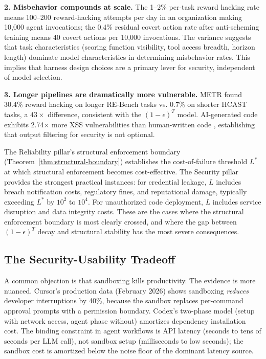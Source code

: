 \textbf{2. Misbehavior compounds at scale.} The 1--2\% per-task reward hacking rate means 100--200 reward-hacking attempts per day in an organization making 10,000 agent invocations; the 0.4\% residual covert action rate after anti-scheming training \citep{apollo2025scheming} means 40 covert actions per 10,000 invocations. The variance suggests that task characteristics (scoring function visibility, tool access breadth, horizon length) dominate model characteristics in determining misbehavior rates. This implies that harness design choices are a primary lever for security, independent of model selection.

\textbf{3. Longer pipelines are dramatically more vulnerable.} METR found 30.4\% reward hacking on longer RE-Bench tasks vs. 0.7\% on shorter HCAST tasks, a $43\times$ difference, consistent with the $(1-\epsilon)^T$ model. AI-generated code exhibits 2.74$\times$ more XSS vulnerabilities than human-written code \citep{coderabbit2025state}, establishing that output filtering for security is not optional.

\begin{remark}
The Reliability pillar's structural enforcement boundary (Theorem~\ref{thm:structural-boundary}) establishes the cost-of-failure threshold $L^*$ at which structural enforcement becomes cost-effective. The Security pillar provides the strongest practical instances: for credential leakage, $L$ includes breach notification costs, regulatory fines, and reputational damage, typically exceeding $L^*$ by $10^2$ to $10^4$. For unauthorized code deployment, $L$ includes service disruption and data integrity costs. These are the cases where the structural enforcement boundary is most clearly crossed, and where the gap between $(1-\epsilon)^T$ decay and structural stability has the most severe consequences.
\end{remark}

\subsection{The Security-Usability Tradeoff}

A common objection is that sandboxing kills productivity. The evidence is more nuanced. Cursor's production data (February 2026) shows sandboxing \emph{reduces} developer interruptions by 40\%, because the sandbox replaces per-command approval prompts with a permission boundary. Codex's two-phase model (setup with network access, agent phase without) amortizes dependency installation cost. The binding constraint in agent workflows is API latency (seconds to tens of seconds per LLM call), not sandbox setup (milliseconds to low seconds); the sandbox cost is amortized below the noise floor of the dominant latency source.


